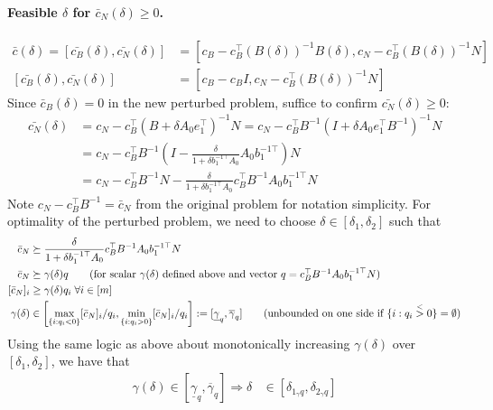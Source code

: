 \documentclass[11pt]{exam}
\begin{document}
\begin{questions}
    \paragraph{Feasible $\delta$ for $\bar c_N(\delta)\geq 0$.}
    \begin{align*}
      \bar c(\delta) = [\bar{c_B}(\delta), \bar{c_N}(\delta)] &= \left[c_B - c_B^\top(B(\delta))^{-1}B(\delta), c_N - c_B^\top(B(\delta))^{-1}N\right]\\
      [\bar{c_B}(\delta), \bar{c_N}(\delta)] &= \left[c_B - c_BI, c_N -  c_B^\top(B(\delta))^{-1}N\right]
    \end{align*}
    Since $\bar c_B(\delta) = 0$ in the new perturbed problem, suffice to confirm $\bar{c_N}(\delta) \geq 0$:
    \begin{align*}
      \bar{c_N}(\delta) &= c_N -  c_B^\top(B + \delta A_0 e_1^\top)^{-1}N = c_N - c_B^\top B^{-1} (I + \delta A_0 e_1^\top B^{-1})^{-1}N\\
      &= c_N -  c_B^\top B^{-1}\left(I - \frac{\delta}{1 + \delta b^{-1\top}_1 A_0}A_0b^{-1\top}_1\right)N\\
      &= c_N - c_B^\top B^{-1}N - \frac{\delta}{1 + \delta b^{-1\top}_1 A_0}c_B^\top B^{-1}A_0b_1^{-1\top}N
    \end{align*}
    Note $c_N - c_B^\top B^{-1} = \bar c_N$ from the original problem for notation simplicity. For optimality of the perturbed problem, we need to choose $\delta \in [\delta_1, \delta_2]$ such that
    \begin{align*}
      \bar c_N &\succeq \frac{\delta}{1 + \delta b^{-1\top}_1 A_0}c_B^\top B^{-1}A_0b_1^{-1\top}N\\
      \bar c_N &\succeq \gamma(\delta) q \tag{for scalar $\gamma(\delta)$ defined above and vector $q = c_B^\top B^{-1}A_0b_1^{-1\top}N$}\\
      [\bar c_N]_i &\geq \gamma(\delta)q_i\;\forall i\in[m]\\
      \gamma(\delta) &\in \left[\max_{\{i: q_i < 0\}}[\bar c_N]_i/q_i,\min_{\{i: q_i > 0\}}[\bar c_N]_i/q_i \right] := [\underline \gamma_q, \overline \gamma_q] \tag{unbounded on one side if $\{i: q_i \overset{<}{>} 0\} = \emptyset$}\\
    \end{align*}
    Using the same logic as above about monotonically increasing $\gamma(\delta)$ over $[\delta_1, \delta_2]$, we have that
    \begin{align*}
      \gamma(\delta) \in [\underline \gamma_q, \overline \gamma_q] \Longrightarrow \delta &\in [\delta_{1_\gamma q}, \delta_{2_\gamma q}]
    \end{align*}


\end{questions}
\end{document}
